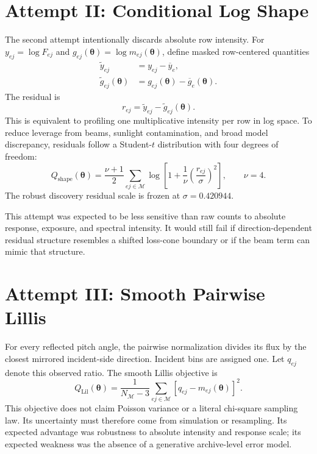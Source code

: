 \documentclass[11pt]{article}
\begin{document}
\section{Attempt II: Conditional Log Shape}

The second attempt intentionally discards absolute row intensity.  For
$y_{ej}=\log F_{ej}$ and $g_{ej}(\boldsymbol\theta)=\log
m_{ej}(\boldsymbol\theta)$, define masked row-centered quantities
\begin{align}
  \widetilde y_{ej} &= y_{ej}-\overline y_e,\\
  \widetilde g_{ej}(\boldsymbol\theta)
    &=g_{ej}(\boldsymbol\theta)-\overline g_e(\boldsymbol\theta).
\end{align}
The residual is
\begin{equation}
  r_{ej}=\widetilde y_{ej}-\widetilde g_{ej}(\boldsymbol\theta).
\end{equation}
This is equivalent to profiling one multiplicative intensity per row in log
space.  To reduce leverage from beams, sunlight contamination, and broad model
discrepancy, residuals follow a Student-$t$ distribution with four degrees of
freedom:
\begin{equation}
  Q_{\mathrm{shape}}(\boldsymbol\theta)
  =\frac{\nu+1}{2}\sum_{ej\in\mathcal M}
  \log\left[1+\frac{1}{\nu}
  \left(\frac{r_{ej}}{\sigma}\right)^2\right],
  \qquad \nu=4.
\end{equation}
The robust discovery residual scale is frozen at $\sigma=0.420944$.

This attempt was expected to be less sensitive than raw counts to absolute
response, exposure, and spectral intensity.  It would still fail if
direction-dependent residual structure resembles a shifted loss-cone boundary
or if the beam term can mimic that structure.

\section{Attempt III: Smooth Pairwise Lillis}

For every reflected pitch angle, the pairwise normalization divides its flux by
the closest mirrored incident-side direction.  Incident bins are assigned one.
Let $q_{ej}$ denote this observed ratio.  The smooth Lillis objective is
\begin{equation}
  Q_{\mathrm{Lil}}(\boldsymbol\theta)
  =\frac{1}{N_{\mathcal M}-3}
  \sum_{ej\in\mathcal M}
  \left[q_{ej}-m_{ej}(\boldsymbol\theta)\right]^2.
\end{equation}
This objective does not claim Poisson variance or a literal chi-square sampling
law.  Its uncertainty must therefore come from simulation or resampling.  Its
expected advantage was robustness to absolute intensity and response scale; its
expected weakness was the absence of a generative archive-level error model.
\end{document}
